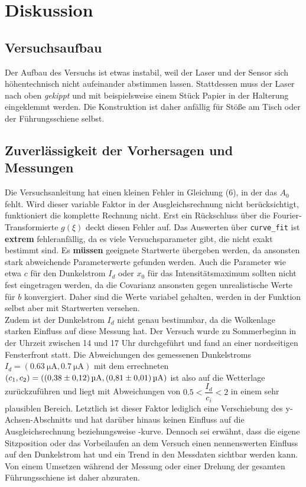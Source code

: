 \section{Diskussion}
\label{sec:Diskussion}

\subsection{Versuchsaufbau}
Der Aufbau des Versuchs ist etwas instabil, weil der Laser und der Sensor sich höhentechnisch nicht aufeinander abstimmen lassen.
Stattdessen muss der Laser nach oben \textit{gekippt} und mit beispielsweise einem Stück Papier in der Halterung eingeklemmt werden.
Die Konstruktion ist daher anfällig für Stöße am Tisch oder der Führungsschiene selbst.

\subsection{Zuverlässigkeit der Vorhersagen und Messungen}
Die Versuchsanleitung hat einen kleinen Fehler in Gleichung (6), in der das $A_0$ fehlt. Wird dieser variable Faktor in der Ausgleichsrechnung nicht berücksichtigt,
funktioniert die komplette Rechnung nicht.
Erst ein Rückschluss über die Fourier-Transformierte $g(\xi)$ deckt diesen Fehler auf.
Das Auswerten über \texttt{curve\_fit} ist \textbf{extrem} fehleranfällig, da es viele Versuchsparameter gibt, die nicht exakt bestimmt sind.
Es \textbf{müssen} geeignete Startwerte übergeben werden, da ansonsten stark abweichende Parameterwerte gefunden werden.
Auch die Parameter wie etwa $c$ für den Dunkelstrom $I_d$ oder $x_0$ für das Intensitätsmaximum sollten nicht fest eingetragen werden, da die Covarianz ansonsten gegen
unrealistische Werte für $b$ konvergiert. Daher sind die Werte variabel gehalten, werden in der Funktion selbst aber mit Startwerten versehen. \\

Zudem ist der Dunkelstrom $I_d$ nicht genau bestimmbar, da die Wolkenlage starken Einfluss auf diese Messung hat. Der Versuch wurde zu Sommerbeginn in der Uhrzeit zwischen
14 und 17 Uhr durchgeführt und fand an einer nordseitigen Fensterfront statt.
Die Abweichungen des gemessenen Dunkelstroms $I_d = (\SI{0.63}{\micro\ampere}, \SI{0.7}{\micro\ampere}) $ mit dem errechneten $(c_1, c_2) = (\SI{0.38\pm0.12}{\micro\ampere}, \SI{0.81\pm0.01}{\micro\ampere})$
ist also auf die Wetterlage zurückzuführen und liegt mit Abweichungen von $0.5 < \dfrac{I_d}{c_i} < 2$ in einem sehr plausiblen Bereich.
Letztlich ist dieser Faktor lediglich eine Verschiebung des y-Achsen-Abschnitts und hat darüber hinaus keinen Einfluss auf die Ausgleichsrechnung beziehungsweise -kurve.
Dennoch sei erwähnt, dass die eigene Sitzposition oder das Vorbeilaufen an dem Versuch einen nennenswerten Einfluss auf den Dunkelstrom hat und ein Trend in den Messdaten sichtbar werden kann.
Von einem Umsetzen während der Messung oder einer Drehung der gesamten Führungsschiene ist daher abzuraten.

